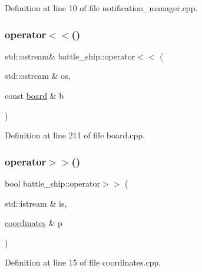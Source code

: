 Definition at line 10 of file notification\+\_\+manager.\+cpp.

\mbox{\label{namespacebattle__ship_a8f319aebd93115655c5cfd648a988e01}} 
\subsubsection{\texorpdfstring{operator$<$$<$()}{operator<<()}\hspace{0.1cm}{\footnotesize\ttfamily [3/3]}}
{\footnotesize\ttfamily std\+::ostream\& battle\+\_\+ship\+::operator$<$$<$ (\begin{DoxyParamCaption}\item[{std\+::ostream \&}]{os,  }\item[{const \hyperlink{classbattle__ship_1_1board}{board} \&}]{b }\end{DoxyParamCaption})}



Definition at line 211 of file board.\+cpp.

\mbox{\label{namespacebattle__ship_ab0747cf7357f5f11e76979fdf9757861}} 
\subsubsection{\texorpdfstring{operator$>$$>$()}{operator>>()}}
{\footnotesize\ttfamily bool battle\+\_\+ship\+::operator$>$$>$ (\begin{DoxyParamCaption}\item[{std\+::istream \&}]{is,  }\item[{\hyperlink{structbattle__ship_1_1coordinates}{coordinates} \&}]{p }\end{DoxyParamCaption})}



Definition at line 15 of file coordinates.\+cpp.

